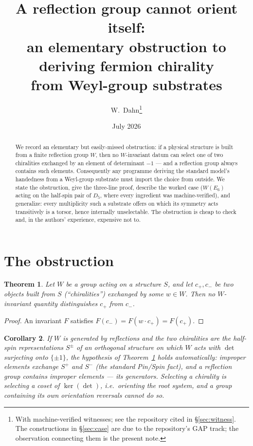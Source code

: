 \documentclass[11pt]{article}
\title{A reflection group cannot orient itself:\\
an elementary obstruction to deriving fermion chirality\\ from Weyl-group substrates}
\author{W.~Dahn\thanks{With machine-verified witnesses; see the repository
cited in \S\ref{sec:witness}. The constructions in \S\ref{sec:case} are due to
the repository's GAP track; the observation connecting them is the present
note.}}
\date{July 2026}
\newtheorem{theorem}{Theorem}
\newtheorem{corollary}[theorem]{Corollary}
\begin{document}
\maketitle

\begin{abstract}
\noindent We record an elementary but easily-missed obstruction: if a physical
structure is built from a finite reflection group $W$, then no $W$-invariant
datum can select one of two chiralities exchanged by an element of determinant
$-1$ --- and a reflection group always contains such elements. Consequently any
programme deriving the standard model's handedness from a Weyl-group substrate
must import the choice from outside. We state the obstruction, give the
three-line proof, describe the worked case ($W(E_6)$ acting on the half-spin
pair of $D_5$, where every ingredient was machine-verified), and generalize:
every multiplicity such a substrate offers on which its symmetry acts
transitively is a torsor, hence internally unselectable. The obstruction is
cheap to check and, in the authors' experience, expensive not to.
\end{abstract}

\section{The obstruction}

\begin{theorem}\label{thm:main}
Let $W$ be a group acting on a structure $S$, and let $c_+,c_-$ be two objects
built from $S$ (``chiralities'') exchanged by some $w\in W$. Then no
$W$-invariant quantity distinguishes $c_+$ from $c_-$.
\end{theorem}

\begin{proof}
An invariant $F$ satisfies $F(c_-)=F(w\cdot c_+)=F(c_+)$.
\end{proof}

\begin{corollary}\label{cor:refl}
If $W$ is generated by reflections and the two chiralities are the half-spin
representations $S^\pm$ of an orthogonal structure on which $W$ acts with
$\det$ surjecting onto $\{\pm1\}$, the hypothesis of
Theorem~\ref{thm:main} holds automatically: improper elements exchange
$S^+$ and $S^-$ (the standard Pin/Spin fact), and a reflection group contains
improper elements --- its generators. Selecting a chirality is selecting a
coset of $\ker(\det)$, i.e.\ \emph{orienting} the root system, and a group
containing its own orientation reversals cannot do so.
\end{corollary}
\end{document}
